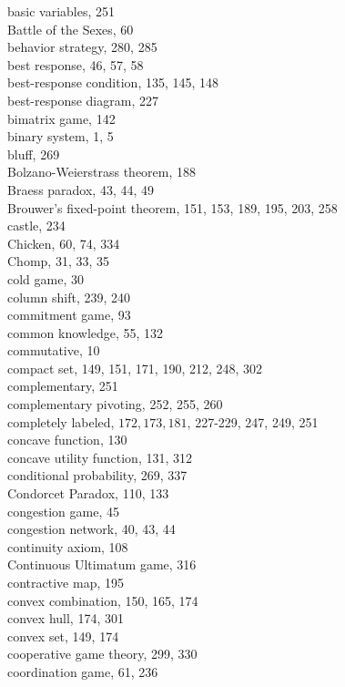 \documentclass[12pt]{article}
\begin{document}
basic variables, 251\\
Battle of the Sexes, 60\\
behavior strategy, 280, 285\\
best response, 46, 57, 58\\
best-response condition, 135, 145, 148\\
best-response diagram, 227\\
bimatrix game, 142\\
binary system, 1, 5\\
bluff, 269\\
Bolzano-Weierstrass theorem, 188\\
Braess paradox, 43, 44, 49\\
Brouwer's fixed-point theorem, 151, 153, 189, 195, 203, 258\\
castle, 234\\
Chicken, 60, 74, 334\\
Chomp, 31, 33, 35\\
cold game, 30\\
column shift, 239, 240\\
commitment game, 93\\
common knowledge, 55, 132\\
commutative, 10\\
compact set, 149, 151, 171, 190, 212, 248, 302\\
complementary, 251\\
complementary pivoting, 252, 255, 260\\
completely labeled, $172,173,181$, 227-229, 247, 249, 251\\
concave function, 130\\
concave utility function, 131, 312\\
conditional probability, 269, 337\\
Condorcet Paradox, 110, 133\\
congestion game, 45\\
congestion network, 40, 43, 44\\
continuity axiom, 108\\
Continuous Ultimatum game, 316\\
contractive map, 195\\
convex combination, 150, 165, 174\\
convex hull, 174, 301\\
convex set, 149, 174\\
cooperative game theory, 299, 330\\
coordination game, 61, 236\\
\end{document}
